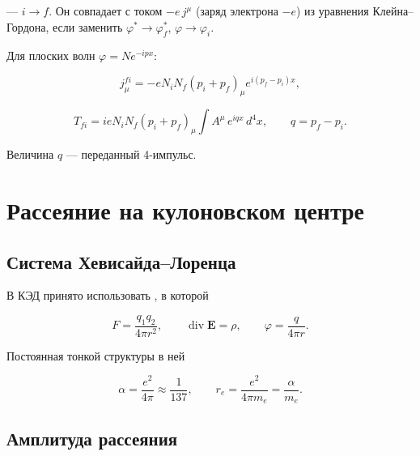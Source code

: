 \documentclass[../final.tex]{subfiles}
\begin{document}
---  $i\to f$. Он совпадает с током
$-e\,j^\mu$ (заряд электрона $-e$) из уравнения Клейна--Гордона,
если заменить $\varphi^*\to\varphi_f^*$, $\varphi\to\varphi_i$.

Для плоских волн $\varphi=Ne^{-ipx}$:

\begin{equation*}
    j^{fi}_\mu
    =
    -eN_iN_f\left(p_i+p_f\right)_\mu e^{i(p_f-p_i)x},
\end{equation*}

\begin{equation*}
    T_{fi}
    =
    ieN_iN_f\left(p_i+p_f\right)_\mu
    \int A^\mu\,e^{iqx}\,d^4x,
    \qquad
    q=p_f-p_i.
\end{equation*}

Величина $q$ --- переданный 4-импульс.


\section{Рассеяние на кулоновском центре}

\subsection{Система Хевисайда--Лоренца}

В КЭД принято использовать
,
в которой

\begin{equation*}
    F=\frac{q_1q_2}{4\pi r^2},
    \qquad
    \operatorname{div}\mathbf E=\rho,
    \qquad
    \varphi=\frac{q}{4\pi r}.
\end{equation*}

Постоянная тонкой структуры в ней

\begin{equation*}
    \alpha=\frac{e^2}{4\pi}\approx\frac{1}{137},
    \qquad
    r_e=\frac{e^2}{4\pi m_e}=\frac{\alpha}{m_e}.
\end{equation*}


\subsection{Амплитуда рассеяния}
\end{document}
